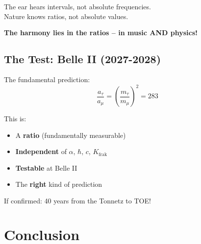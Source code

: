 \begin{keypoint}
	The ear hears intervals, not absolute frequencies. \\
	Nature knows ratios, not absolute values.
	
	\textbf{The harmony lies in the ratios -- in music AND physics!}
\end{keypoint}

\subsection{The Test: Belle II (2027-2028)}

The fundamental prediction:
\begin{equation}
	\boxed{\frac{a_\tau}{a_\mu} = \left(\frac{m_\tau}{m_\mu}\right)^2 = 283}
\end{equation}

This is:
\begin{itemize}[nosep]
	\item A \textbf{ratio} (fundamentally measurable)
	\item \textbf{Independent} of $\alpha$, $\hbar$, $c$, $K_\text{frak}$
	\item \textbf{Testable} at Belle II
	\item The \textbf{right} kind of prediction
\end{itemize}

If confirmed: 40 years from the Tonnetz to TOE!

\section{Conclusion}

